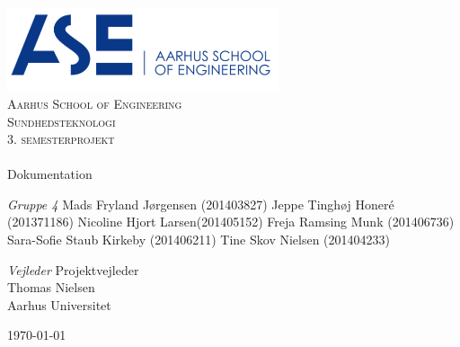 \begin{titlingpage}
\begin{center}

~ \\[3cm]

\includegraphics[width=0.6\textwidth]{figurer/ASE}~\\[1cm]

\textsc{\LARGE Aarhus School of Engineering}\\[1.5cm]

\textsc{\Large Sundhedsteknologi}\\
\textsc{\Large 3. semesterprojekt}\\[0.5cm]

\noindent\makebox[\linewidth]{\rule{\textwidth}{0.4pt}}\\
[0.5cm]{\Huge Dokumentation}
\noindent\makebox[\linewidth]{\rule{\textwidth}{0.4pt}}

\end{center}

\textit{Gruppe 4} \newline
Mads Fryland J\o rgensen (201403827) \newline
Jeppe Tinghøj Honeré (201371186) \newline
Nicoline Hjort Larsen(201405152) \newline
Freja Ramsing Munk (201406736) \newline		 
Sara-Sofie Staub Kirkeby (201406211) \newline
Tine Skov Nielsen (201404233) \newline



\textit{Vejleder} \newline
Projektvejleder\\
Thomas Nielsen\\
Aarhus Universitet


\vfill

\begin{center}
{\large \today}
\end{center}


\end{titlingpage}